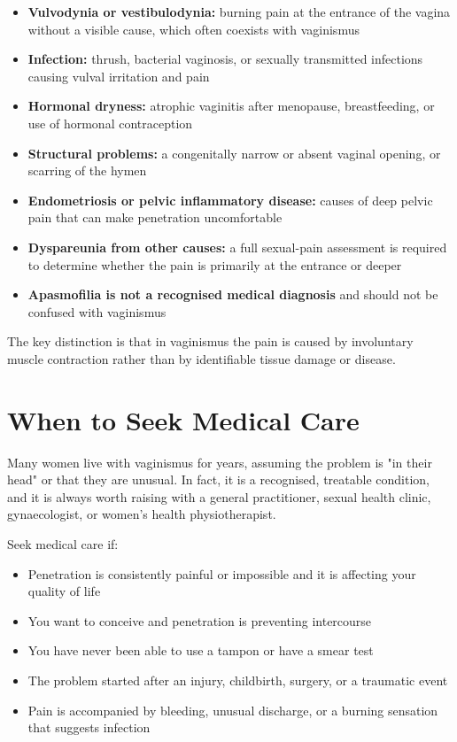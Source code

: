 \begin{itemize}
    \item \textbf{Vulvodynia or vestibulodynia:} burning pain at the entrance of the vagina without a visible cause, which often coexists with vaginismus
    \item \textbf{Infection:} thrush, bacterial vaginosis, or sexually transmitted infections causing vulval irritation and pain
    \item \textbf{Hormonal dryness:} atrophic vaginitis after menopause, breastfeeding, or use of hormonal contraception
    \item \textbf{Structural problems:} a congenitally narrow or absent vaginal opening, or scarring of the hymen
    \item \textbf{Endometriosis or pelvic inflammatory disease:} causes of deep pelvic pain that can make penetration uncomfortable
    \item \textbf{Dyspareunia from other causes:} a full sexual-pain assessment is required to determine whether the pain is primarily at the entrance or deeper
    \item \textbf{Apasmofilia is not a recognised medical diagnosis} and should not be confused with vaginismus
\end{itemize}

The key distinction is that in vaginismus the pain is caused by involuntary muscle contraction rather than by identifiable tissue damage or disease.

\section*{When to Seek Medical Care}
Many women live with vaginismus for years, assuming the problem is "in their head" or that they are unusual. In fact, it is a recognised, treatable condition, and it is always worth raising with a general practitioner, sexual health clinic, gynaecologist, or women's health physiotherapist.

Seek medical care if:
\begin{itemize}
    \item Penetration is consistently painful or impossible and it is affecting your quality of life
    \item You want to conceive and penetration is preventing intercourse
    \item You have never been able to use a tampon or have a smear test
    \item The problem started after an injury, childbirth, surgery, or a traumatic event
    \item Pain is accompanied by bleeding, unusual discharge, or a burning sensation that suggests infection
\end{itemize}

